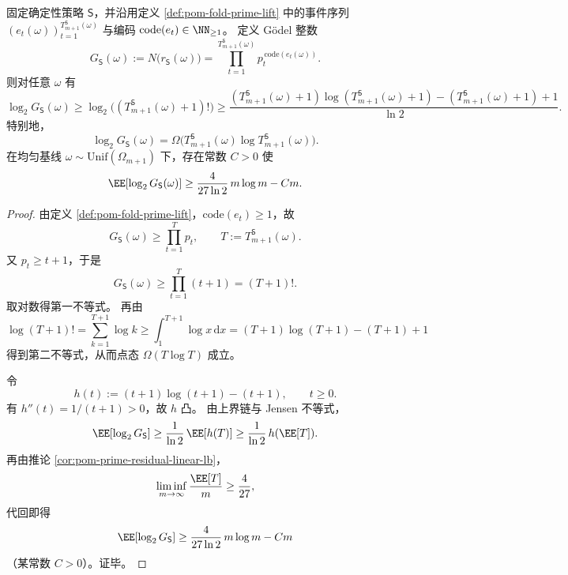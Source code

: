 \begin{theorem}\label{thm:conclusion-prime-integerization-superlinear-bitlength}
固定确定性策略 \(\mathsf S\)，并沿用定义 \ref{def:pom-fold-prime-lift} 中的事件序列
\((e_t(\omega))_{t=1}^{T_{m+1}^{\mathsf S}(\omega)}\) 与编码 \(\mathrm{code}(e_t)\in\NN_{\ge 1}\)。
定义 Gödel 整数
\[
G_{\mathsf S}(\omega):=N\!\bigl(r_{\mathsf S}(\omega)\bigr)
=\prod_{t=1}^{T_{m+1}^{\mathsf S}(\omega)}p_t^{\,\mathrm{code}(e_t(\omega))}.
\]
则对任意 \(\omega\) 有
\[
\log_2 G_{\mathsf S}(\omega)
\ge
\log_2\!\bigl((T_{m+1}^{\mathsf S}(\omega)+1)!\bigr)
\ge
\frac{(T_{m+1}^{\mathsf S}(\omega)+1)\log(T_{m+1}^{\mathsf S}(\omega)+1)-(T_{m+1}^{\mathsf S}(\omega)+1)+1}{\ln 2}.
\]
特别地，
\[
\log_2 G_{\mathsf S}(\omega)=\Omega\!\bigl(T_{m+1}^{\mathsf S}(\omega)\log T_{m+1}^{\mathsf S}(\omega)\bigr).
\]
在均匀基线 \(\omega\sim\mathrm{Unif}(\Omega_{m+1})\) 下，存在常数 \(C>0\) 使
\[
\EE[\log_2 G_{\mathsf S}(\omega)]
\ge
\frac{4}{27\ln 2}\,m\log m-Cm.
\]
\end{theorem}
\begin{proof}
由定义 \ref{def:pom-fold-prime-lift}，\(\mathrm{code}(e_t)\ge 1\)，故
\[
G_{\mathsf S}(\omega)\ge \prod_{t=1}^{T}p_t,\qquad T:=T_{m+1}^{\mathsf S}(\omega).
\]
又 \(p_t\ge t+1\)，于是
\[
G_{\mathsf S}(\omega)\ge \prod_{t=1}^{T}(t+1)=(T+1)!.
\]
取对数得第一不等式。
再由
\[
\log (T+1)!
=\sum_{k=1}^{T+1}\log k
\ge
\int_1^{T+1}\log x\,\mathrm dx
=(T+1)\log(T+1)-(T+1)+1
\]
得到第二不等式，从而点态 \(\Omega(T\log T)\) 成立。

令
\[
h(t):=(t+1)\log(t+1)-(t+1),\qquad t\ge 0.
\]
有 \(h''(t)=1/(t+1)>0\)，故 \(h\) 凸。
由上界链与 Jensen 不等式，
\[
\EE[\log_2 G_{\mathsf S}]
\ge
\frac{1}{\ln 2}\,\EE[h(T)]
\ge
\frac{1}{\ln 2}\,h(\EE[T]).
\]
再由推论 \ref{cor:pom-prime-residual-linear-lb}，
\[
\liminf_{m\to\infty}\frac{\EE[T]}{m}\ge \frac{4}{27},
\]
代回即得
\[
\EE[\log_2 G_{\mathsf S}]
\ge
\frac{4}{27\ln 2}\,m\log m-Cm
\]
（某常数 \(C>0\)）。证毕。
\end{proof}

